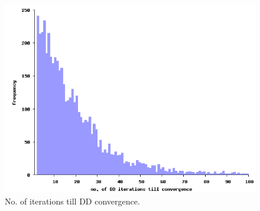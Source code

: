 \begin{figure}
\begin{center}
\includegraphics[width=\columnwidth]{histogram.png}
\caption{No. of iterations till DD convergence.}
\label{fig:histo}
\end{center}
\end{figure}



%
%
%

